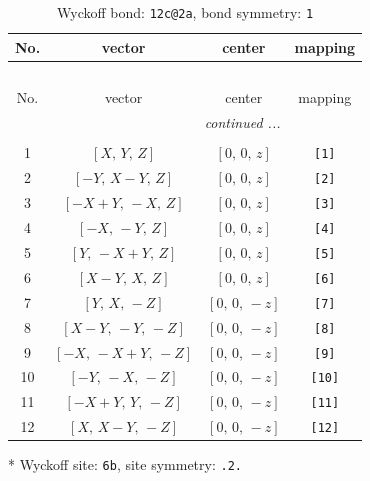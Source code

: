 \documentclass[fleqn,8pt]{jsarticle}
\begin{document}
\renewcommand{\arraystretch}{1.2}
\begin{longtable}{cccc}
\caption{Wyckoff bond: {\tt 12c@2a}, bond symmetry: {\tt 1}}
 \\
 \hline \hline
No. & vector & center & mapping \\ \hline \endfirsthead

\multicolumn{3}{l}{\tablename\ \thetable{}} \\
 \hline \hline
No. & vector & center & mapping \\ \hline \endhead

 \hline \hline
\multicolumn{3}{r}{\footnotesize\it continued ...} \\ \endfoot

 \hline \hline
\multicolumn{3}{r}{} \\ \endlastfoot

1 & $\left[ X,\, Y,\, Z \right]$ & $\left[ 0,\, 0,\, z \right]$ & {\tt [1]} \\ \hline
2 & $\left[ - Y,\, X - Y,\, Z \right]$ & $\left[ 0,\, 0,\, z \right]$ & {\tt [2]} \\ \hline
3 & $\left[ - X + Y,\, - X,\, Z \right]$ & $\left[ 0,\, 0,\, z \right]$ & {\tt [3]} \\ \hline
4 & $\left[ - X,\, - Y,\, Z \right]$ & $\left[ 0,\, 0,\, z \right]$ & {\tt [4]} \\ \hline
5 & $\left[ Y,\, - X + Y,\, Z \right]$ & $\left[ 0,\, 0,\, z \right]$ & {\tt [5]} \\ \hline
6 & $\left[ X - Y,\, X,\, Z \right]$ & $\left[ 0,\, 0,\, z \right]$ & {\tt [6]} \\ \hline
7 & $\left[ Y,\, X,\, - Z \right]$ & $\left[ 0,\, 0,\, - z \right]$ & {\tt [7]} \\ \hline
8 & $\left[ X - Y,\, - Y,\, - Z \right]$ & $\left[ 0,\, 0,\, - z \right]$ & {\tt [8]} \\ \hline
9 & $\left[ - X,\, - X + Y,\, - Z \right]$ & $\left[ 0,\, 0,\, - z \right]$ & {\tt [9]} \\ \hline
10 & $\left[ - Y,\, - X,\, - Z \right]$ & $\left[ 0,\, 0,\, - z \right]$ & {\tt [10]} \\ \hline
11 & $\left[ - X + Y,\, Y,\, - Z \right]$ & $\left[ 0,\, 0,\, - z \right]$ & {\tt [11]} \\ \hline
12 & $\left[ X,\, X - Y,\, - Z \right]$ & $\left[ 0,\, 0,\, - z \right]$ & {\tt [12]} \\
\end{longtable}
* Wyckoff site: {\tt 6b}, site symmetry: {\tt .2.}
\renewcommand{\arraystretch}{1.2}
\end{document}

